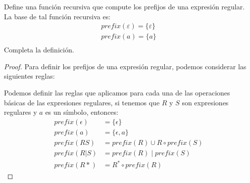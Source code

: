 \begin{Pro}
    Define una función recursiva que compute los prefijos de una expresión regular. La
    base de tal función recursiva es: 
    \begin{align*}
        prefix(\varepsilon) = \{\varepsilon\}\\
        prefix(a) = \{a\}\\ 
    \end{align*}
    Completa la definición. 
\end{Pro}

\begin{proof}
    \hspace{5mm}
    Para definir los prefijos de una expresión regular, podemos considerar las siguientes reglas:

    Podemos definir las reglas que aplicamos para cada una de las operaciones básicas de las expresiones regulares, 
    si tenemos que $R$ y $S$ son expresiones regulares y $a$ es un símbolo, entonces:
    \begin{align*}
        prefix(\epsilon) & = \{\epsilon\}\\
        prefix(a) & = \{\epsilon, a\}\\
        prefix(RS) & = prefix(R) \cup R \circ prefix(S)\\
        prefix(R|S) & = prefix(R) \mid prefix(S)\\
        prefix(R*) & = R^* \circ prefix(R)
    \end{align*}

\end{proof}